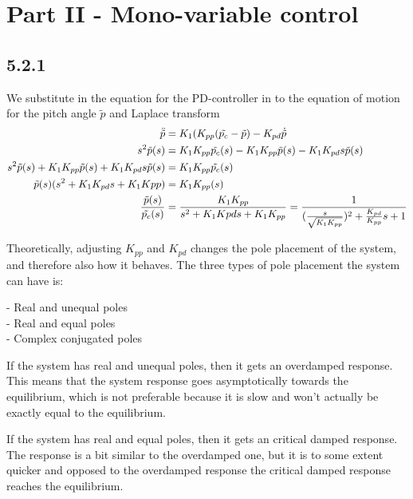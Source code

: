 \section*{Part II - Mono-variable control}

\subsection*{5.2.1}
We substitute in the equation for the PD-controller in to the equation of motion for the pitch angle $\tilde{p}$ and Laplace transform
\begin{align*}
    \ddot{\tilde{p}}                                                    &= K_1(K_{pp}(\tilde{p_c}-\tilde{p})- K_{pd}\dot{\tilde{p}}\\
    s^2\tilde{p}(s)                                                     &= K_1K_{pp}\tilde{p_c}(s)-K_1K_{pp}\tilde{p}(s)-K_1K_{pd}s\tilde{p}(s)\\
    s^2\tilde{p}(s) + K_1K_{pp}\tilde{p}(s) + K_1K_{pd}s\tilde{p}(s)    &= K_1K_{pp}\tilde{p_c}(s)\\
    \tilde{p}(s)(s^2+K_1K_{pd}s + K_1K{pp})                             &= K_1K_{pp}\title{p_c}(s)\\
    \frac{\tilde{p}(s)}{\tilde{p_c}(s)}                                 &= \frac{K_1K_{pp}}{s^2 + K_1K{pd}s + K_1K_{pp}} = \frac{1}{(\frac{s}{\sqrt{K_1K_{pp}}})^2+\frac{K_{pd}}{K_{pp}}s +1}
\end{align*}

Theoretically, adjusting $K_{pp}$ and $K_{pd}$ changes the pole placement of the system, and therefore also how it behaves. The three types of pole placement the system can have is:

- Real and unequal poles\\
- Real and equal poles\\
- Complex conjugated poles

If the system has real and unequal poles, then it gets an overdamped response. This means that the system response goes asymptotically towards the equilibrium, which is not preferable because it is slow and won't actually be exactly equal to the equilibrium. 

If the system has real and equal poles, then it gets an critical damped response. The response is a bit similar to the overdamped one, but it is to some extent quicker and opposed to the overdamped response the critical damped response reaches the equilibrium.

